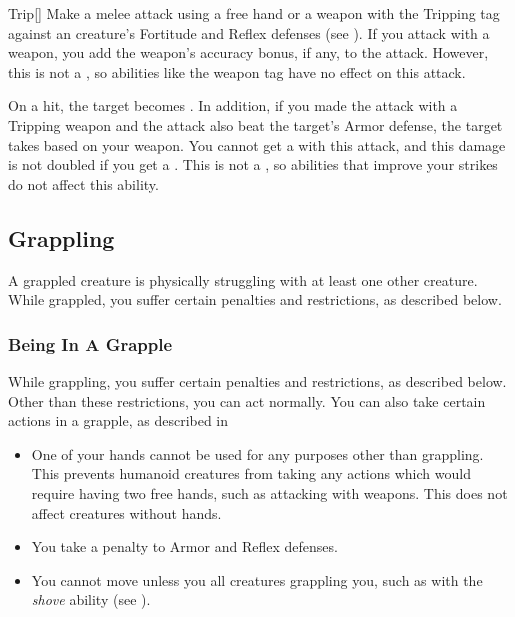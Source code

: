         \begin{activeability}{Trip}[]
            \rankline
            Make a melee attack using a free hand or a weapon with the Tripping tag against an creature's Fortitude and Reflex defenses (see ).
            If you attack with a weapon, you add the weapon's accuracy bonus, if any, to the attack.
            However, this is not a , so abilities like the  weapon tag have no effect on this attack.

            On a hit, the target becomes \prone.
            In addition, if you made the attack with a Tripping weapon and the attack also beat the target's Armor defense, the target takes  based on your weapon.
            You cannot get a  with this attack, and this damage is not doubled if you get a .
            This is not a , so abilities that improve your strikes do not affect this ability.
        \end{activeability}

    \subsection{Grappling}\label{Grappling}
        A grappled creature is physically struggling with at least one other creature.
        While grappled, you suffer certain penalties and restrictions, as described below.

        \subsubsection{Being In A Grapple}
            While grappling, you suffer certain penalties and restrictions, as described below. Other than these restrictions, you can act normally. You can also take certain actions in a grapple, as described in 
            \begin{itemize}
                \item One of your hands cannot be used for any purposes other than grappling.
                    This prevents humanoid creatures from taking any actions which would require having two free hands, such as attacking with  weapons.
                    This does not affect creatures without hands.
                \item You take a  penalty to Armor and Reflex defenses.
                \item You cannot move unless you  all creatures grappling you, such as with the \textit{shove} ability (see ).
            \end{itemize}

